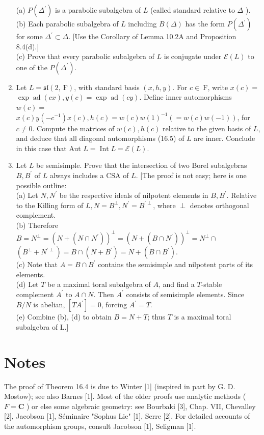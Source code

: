 \documentclass[10pt]{article}
\begin{document}
\begin{enumerate}
(a) $P\left(\Delta^{\prime}\right)$ is a parabolic subalgebra of $L$ (called standard relative to $\Delta$ ).\\
(b) Each parabolic subalgebra of $L$ including $B(\Delta)$ has the form $P\left(\Delta^{\prime}\right)$ for some $\Delta^{\prime} \subset \Delta$. [Use the Corollary of Lemma 10.2A and Proposition 8.4(d).]\\
(c) Prove that every parabolic subalgebra of $L$ is conjugate under $\mathscr{E}(L)$ to one of the $P\left(\Delta^{\prime}\right)$.
  \item Let $L=\mathfrak{s l}(2, \mathrm{~F})$, with standard basis $(x, h, y)$. For $c \in \mathrm{~F}$, write $x(c)=$ $\exp \operatorname{ad}(c x), y(c)=\exp \operatorname{ad}(c y)$. Define inner automorphisms $w(c)=$ $x(c) y\left(-c^{-1}\right) x(c), h(c)=w(c) w(1)^{-1}(=w(c) w(-1))$, for $c \neq 0$. Compute the matrices of $w(c), h(c)$ relative to the given basis of $L$, and deduce that all diagonal automorphisms (16.5) of $L$ are inner. Conclude in this case that Aut $L=\operatorname{Int} L=\mathscr{E}(L)$.
  \item Let $L$ be semisimple. Prove that the intersection of two Borel subalgebras $B, B^{\prime}$ of $L$ always includes a CSA of $L$. [The proof is not easy; here is one possible outline:\\
(a) Let $N, N^{\prime}$ be the respective ideals of nilpotent elements in $B, B^{\prime}$. Relative to the Killing form of $L, N=B^{\perp}, N^{\prime}=B^{\prime \perp}$, where $\perp$ denotes orthogonal complement.\\
(b) Therefore $B=N^{\perp}=\left(N+\left(N \cap N^{\prime}\right)\right)^{\perp}=\left(N+\left(B \cap N^{\prime}\right)\right)^{\perp}=N^{\perp} \cap$ $\left(B^{\perp}+N^{\prime \perp}\right)=B \cap\left(N+B^{\prime}\right)=N+\left(B \cap B^{\prime}\right)$.\\
(c) Note that $A=B \cap B^{\prime}$ contains the semisimple and nilpotent parts of its elements.\\
(d) Let $T$ be a maximal toral subalgebra of $A$, and find a $T$-stable complement $A^{\prime}$ to $A \cap N$. Then $A^{\prime}$ consists of semisimple elements. Since $B / N$ is abelian, $\left[T A^{\prime}\right]=0$, forcing $A^{\prime}=T$.\\
(e) Combine (b), (d) to obtain $B=N+T$; thus $T$ is a maximal toral subalgebra of L.]
\end{enumerate}

\section*{Notes}
The proof of Theorem 16.4 is due to Winter [1] (inspired in part by G. D. Mostow); see also Barnes [1]. Most of the older proofs use analytic methods ( $F=\mathbf{C}$ ) or else some algebraic geometry: see Bourbaki [3], Chap. VII, Chevalley [2], Jacobson [1], Séminaire "Sophus Lie" [1], Serre [2]. For detailed accounts of the automorphism groups, consult Jacobson [1], Seligman [1].
\end{document}
